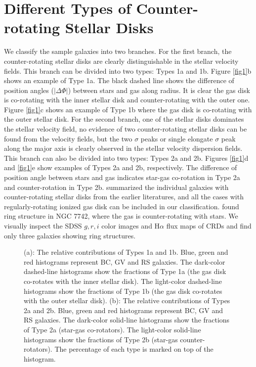 \documentclass{aastex631}
\begin{document}
\section{Different Types of Counter-rotating Stellar Disks} \label{sec:results}
We classify the sample galaxies into two branches. For the first branch, the counter-rotating stellar disks are clearly distinguishable in the stellar velocity fields. This branch can be divided into two types: Types 1a and 1b. Figure \ref{fig1}b shows an example of Type 1a. The black dashed line shows the difference of position angles ($|\Delta\Phi|$) between stars and gas along radius. It is clear the gas disk is co-rotating with the inner stellar disk and counter-rotating with the outer one. Figure \ref{fig1}c shows an example of Type 1b where the gas disk is co-rotating with the outer stellar disk. For the second branch, one of the stellar disks dominates the stellar velocity field, no evidence of two counter-rotating stellar disks can be found from the velocity fields, but the two $\sigma$ peaks or single elongate $\sigma$ peak along the major axis is clearly observed in the stellar velocity dispersion fields. This branch can also be divided into two types: Types 2a and 2b. Figures \ref{fig1}d and \ref{fig1}e show examples of Types 2a and 2b, respectively. The difference of position angle between stars and gas indicates star-gas co-rotation in Type 2a and counter-rotation in Type 2b. \cite{2014ASPC..486...51C} summarized the individual galaxies with counter-rotating stellar disks from the earlier literatures, and all the cases with regularly-rotating ionized gas disk can be included in our classification. \cite{2006ApJ...649L..79M} found ring structure in NGC 7742, where the gas is counter-rotating with stars. We visually inspect the SDSS $g, r, i$ color images and H$\alpha$ flux maps of CRDs and find only three galaxies showing ring structures.

\begin{figure}[ht!]
    \caption{(a): The relative contributions of Types 1a and 1b. Blue, green and red histograms represent BC, GV and RS galaxies. The dark-color dashed-line histograms show the fractions of Type 1a (the gas disk co-rotates with the inner stellar disk). The light-color dashed-line histograms show the fractions of Type 1b (the gas disk co-rotates with the outer stellar disk). (b): The relative contributions of Types 2a and 2b. Blue, green and red histograms represent BC, GV and RS galaxies. The dark-color solid-line histograms show the fractions of Type 2a (star-gas co-rotators). The light-color solid-line histograms show the fractions of Type 2b (star-gas counter-rotators). The percentage of each type is marked on top of the histogram. \label{fig2}}
    \end{figure}
\end{document}
